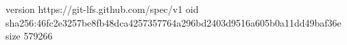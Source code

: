 version https://git-lfs.github.com/spec/v1
oid sha256:46fc2e3257be8fb48dca4257357764a296bd2403d9516a605b0a11dd49baf36e
size 579266
